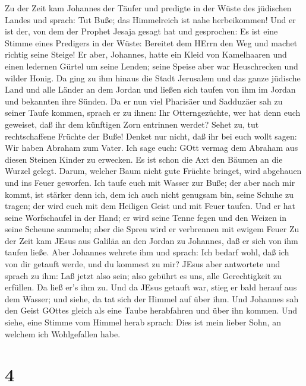  Zu der Zeit kam Johannes der Täufer und predigte in der
Wüste des jüdischen Landes  und sprach: Tut Buße; das
Himmelreich ist nahe herbeikommen!  Und er ist der, von dem
der Prophet Jesaja gesagt hat und gesprochen: Es ist eine Stimme eines
Predigers in der Wüste: Bereitet dem HErrn den Weg und machet richtig
seine Steige!  Er aber, Johannes, hatte ein Kleid von
Kamelhaaren und einen ledernen Gürtel um seine Lenden; seine Speise aber
war Heuschrecken und wilder Honig.  Da ging zu ihm hinaus
die Stadt Jerusalem und das ganze jüdische Land und alle Länder an dem
Jordan  und ließen sich taufen von ihm im Jordan und
bekannten ihre Sünden.  Da er nun viel Pharisäer und
Sadduzäer sah zu seiner Taufe kommen, sprach er zu ihnen: Ihr
Otterngezüchte, wer hat denn euch geweiset, daß ihr dem künftigen Zorn
entrinnen werdet?  Sehet zu, tut rechtschaffene Früchte der
Buße!  Denket nur nicht, daß ihr bei euch wollt sagen: Wir
haben Abraham zum Vater. Ich sage euch: GOtt vermag dem Abraham aus
diesen Steinen Kinder zu erwecken.  Es ist schon die Axt
den Bäumen an die Wurzel gelegt. Darum, welcher Baum nicht gute Früchte
bringet, wird abgehauen und ins Feuer geworfen.  Ich taufe
euch mit Wasser zur Buße; der aber nach mir kommt, ist stärker denn ich,
dem ich auch nicht genugsam bin, seine Schuhe zu tragen; der wird euch
mit dem Heiligen Geist und mit Feuer taufen.  Und er hat
seine Worfschaufel in der Hand; er wird seine Tenne fegen und den Weizen
in seine Scheune sammeln; aber die Spreu wird er verbrennen mit ewigem
Feuer  Zu der Zeit kam JEsus aus Galiläa an den Jordan zu
Johannes, daß er sich von ihm taufen ließe.  Aber Johannes
wehrete ihm und sprach: Ich bedarf wohl, daß ich von dir getauft werde,
und du kommest zu mir?  JEsus aber antwortete und sprach zu
ihm: Laß jetzt also sein; also gebührt es uns, alle Gerechtigkeit zu
erfüllen. Da ließ er's ihm zu.  Und da JEsus getauft war,
stieg er bald herauf aus dem Wasser; und siehe, da tat sich der Himmel
auf über ihm. Und Johannes sah den Geist GOttes gleich als eine Taube
herabfahren und über ihn kommen.  Und siehe, eine Stimme
vom Himmel herab sprach: Dies ist mein lieber Sohn, an welchem ich
Wohlgefallen habe.

\hypertarget{section-3}{%
\section{4}\label{section-3}}

